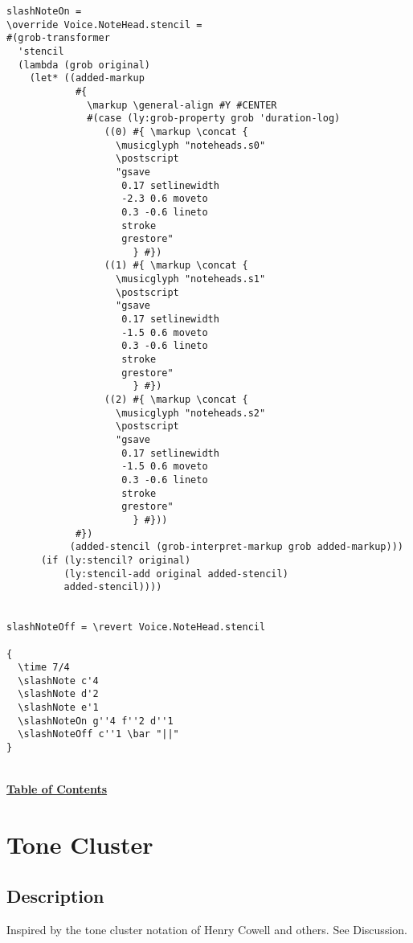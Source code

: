 \documentclass[11pt, oneside]{book}   	%
\begin{document}
\begin{verbatim}
slashNoteOn =
\override Voice.NoteHead.stencil =
#(grob-transformer
  'stencil
  (lambda (grob original)
    (let* ((added-markup
            #{
              \markup \general-align #Y #CENTER
              #(case (ly:grob-property grob 'duration-log)
                 ((0) #{ \markup \concat {
                   \musicglyph "noteheads.s0"
                   \postscript
                   "gsave 
                    0.17 setlinewidth 
                    -2.3 0.6 moveto 
                    0.3 -0.6 lineto
                    stroke 
                    grestore"
                      } #})
                 ((1) #{ \markup \concat {
                   \musicglyph "noteheads.s1"
                   \postscript
                   "gsave 
                    0.17 setlinewidth 
                    -1.5 0.6 moveto 
                    0.3 -0.6 lineto
                    stroke 
                    grestore"
                      } #})
                 ((2) #{ \markup \concat {
                   \musicglyph "noteheads.s2"
                   \postscript
                   "gsave 
                    0.17 setlinewidth 
                    -1.5 0.6 moveto 
                    0.3 -0.6 lineto
                    stroke 
                    grestore"
                      } #}))
            #})
           (added-stencil (grob-interpret-markup grob added-markup)))
      (if (ly:stencil? original)
          (ly:stencil-add original added-stencil)
          added-stencil))))


slashNoteOff = \revert Voice.NoteHead.stencil

{
  \time 7/4
  \slashNote c'4
  \slashNote d'2
  \slashNote e'1
  \slashNoteOn g''4 f''2 d''1
  \slashNoteOff c''1 \bar "||"
}
\end{verbatim}
\hyperref[sec:toc]{\\ \textbf{Table of Contents}}

\vfill \break



\section {Tone Cluster}
\hfill
\subsection{Description}
Inspired by the tone cluster notation of Henry Cowell and others. See Discussion.
\end{document}
